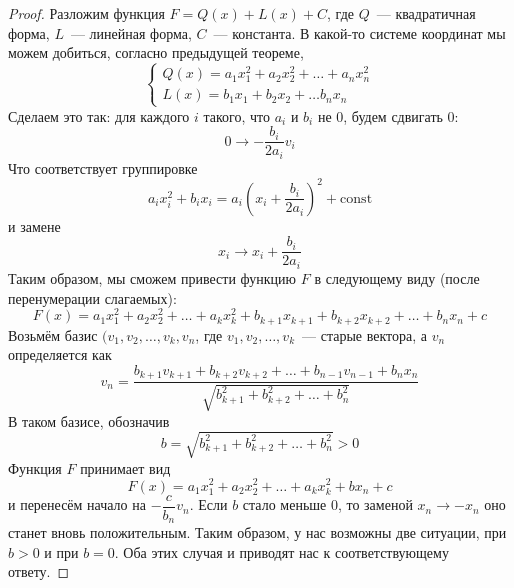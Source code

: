 \documentclass[11pt]{article}
\begin{document}
    \begin{proof}
    Разложим функция $F = Q(x) + L(x) + C$, где $Q$~--- квадратичная форма, $L$~--- линейная форма, $C$~--- константа. В какой-то системе координат мы можем добиться, согласно предыдущей теореме,
    \begin{equation*}
    \begin{cases}
        Q(x) = a_1x_1^2 + a_2x_2^2 + \hdots + a_nx_n^2\\
        L(x) = b_1x_1 + b_2x_2 + \hdots b_nx_n
    \end{cases}
    \end{equation*}
    Сделаем это так: для каждого $i$ такого, что $a_i$ и $b_i$ не $0$, будем сдвигать $0$:
    \begin{equation*}
        0 \to -\dfrac{b_i}{2a_i}v_i
    \end{equation*}
    Что соответствует группировке
    \begin{equation*}
        a_ix_i^2 + b_ix_i = a_i(x_i + \dfrac{b_i}{2a_i})^2 + \text{const}
    \end{equation*}
    и замене
    \begin{equation*}
        x_i \to x_i + \dfrac{b_i}{2a_i}
    \end{equation*}
    Таким образом, мы сможем привести функцию $F$ в следующему виду (после перенумерации слагаемых):
    \begin{equation*}
        F(x) = a_1x_1^2 + a_2x_2^2 + \hdots + a_kx_k^2 + b_{k + 1}x_{k + 1} + b_{k + 2}x_{k + 2} + \hdots + b_nx_n + c
    \end{equation*}
    Возьмём базис $(v_1, v_2, \hdots, v_k, v_n$, где $v_1, v_2, \hdots, v_k$~--- старые вектора, а $v_n$ определяется как
    \begin{equation*}
        v_n = \dfrac{b_{k + 1}v_{k+1} + b_{k + 2}v_{k + 2} + \hdots + b_{n - 1}v_{n - 1} + b_{n}x_n}{\sqrt{b_{k+1}^2 + b_{k+2}^2 + \hdots + b_{n}^2}}
    \end{equation*}
    В таком базисе, обозначив
    \begin{equation*}
        b = \sqrt{b_{k+1}^2 + b_{k+2}^2 + \hdots + b_{n}^2} > 0
    \end{equation*}
    Функция $F$ принимает вид
    \begin{equation*}
        F(x) = a_1x_1^2 + a_2x_2^2 + \hdots + a_kx_k^2 + bx_n + c
    \end{equation*}
    и перенесём начало на $-\dfrac{c}{b_n}v_n$. Если $b$ стало меньше $0$, то заменой $x_n \to -x_n$ оно станет вновь положительным. Таким образом, у нас возможны две ситуации, при $b > 0$ и при $b = 0$. Оба этих случая и приводят нас к соответствующему ответу.
    \end{proof}
\end{document}
